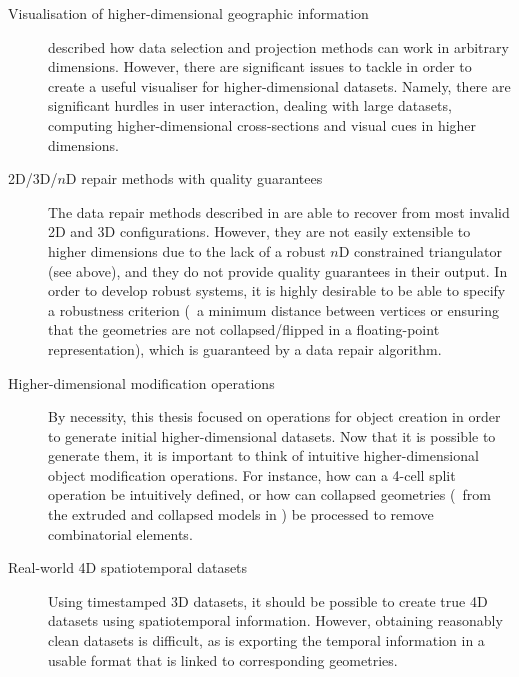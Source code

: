 \begin{description}
\item[Visualisation of higher-dimensional geographic information]  described how data selection and projection methods can work in arbitrary dimensions.
However, there are significant issues to tackle in order to create a useful visualiser for higher-dimensional datasets.
Namely, there are significant hurdles in user interaction, dealing with large datasets, computing higher-dimensional cross-sections and visual cues in higher dimensions.

\item[2D/3D/$n$D repair methods with quality guarantees] The data repair methods described in  are able to recover from most invalid 2D and 3D configurations.
However, they are not easily extensible to higher dimensions due to the lack of a robust $n$D constrained triangulator (see above), and they do not provide quality guarantees in their output.
In order to develop robust systems, it is highly desirable to be able to specify a robustness criterion (\eg\ a minimum distance between vertices or ensuring that the geometries are not collapsed/flipped in a floating-point representation), which is guaranteed by a data repair algorithm.

\item[Higher-dimensional modification operations] By necessity, this thesis focused on operations for object creation in order to generate initial higher-dimensional datasets.
Now that it is possible to generate them, it is important to think of intuitive higher-dimensional object modification operations.
For instance, how can a 4-cell split operation be intuitively defined, or how can collapsed geometries (\eg\ from the extruded and collapsed models in ) be processed to remove combinatorial elements.

\item[Real-world 4D spatiotemporal datasets] Using timestamped 3D datasets, it should be possible to create true 4D datasets using spatiotemporal information.
However, obtaining reasonably clean datasets is difficult, as is exporting the temporal information in a usable format that is linked to corresponding geometries.

\end{description}